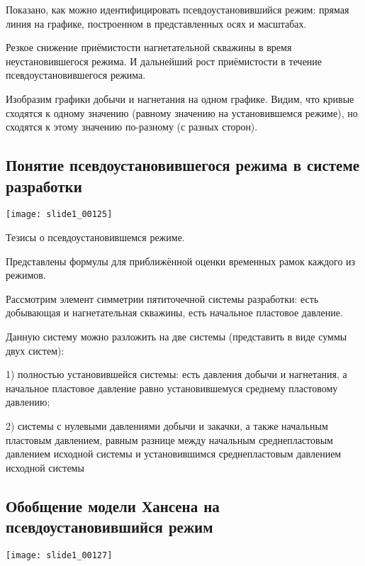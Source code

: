 \documentclass[main.tex]{subfiles}
\begin{document}

Показано, как можно идентифицировать псевдоустановившийся режим: прямая линия  на графике, построенном в представленных осях и масштабах.


Резкое снижение приёмистости нагнетательной скважины в время неустановившегося режима. И дальнейший рост приёмистости в течение псевдоустановившегося режима. 


Изобразим графики добычи и нагнетания на одном графике. Видим, что кривые сходятся к одному значению (равному значению на установившемся режиме), но сходятся к этому значению по-разному (с разных сторон).

\subsection{Понятие псевдоустановившегося режима в системе разработки}

\texttt{[image: slide1\_00125]}

Тезисы о псевдоустановившемся режиме.

Представлены формулы для приближённой оценки временных рамок каждого из режимов.


Рассмотрим элемент симметрии пятиточечной системы разработки: есть добывающая и нагнетательная скважины, есть начальное пластовое давление.

Данную систему можно разложить на две системы (представить в виде суммы двух систем):

1) полностью установившейся системы: есть давления добычи и нагнетания, а начальное пластовое давление равно установившемуся среднему пластовому давлению;

2) системы с нулевыми давлениями добычи и закачки, а также начальным пластовым давлением, равным разнице между начальным среднепластовым давлением исходной системы и установившимся среднепластовым давлением исходной системы

\subsection{Обобщение модели Хансена на псевдоустановившийся режим}

\texttt{[image: slide1\_00127]}

\end{document}
